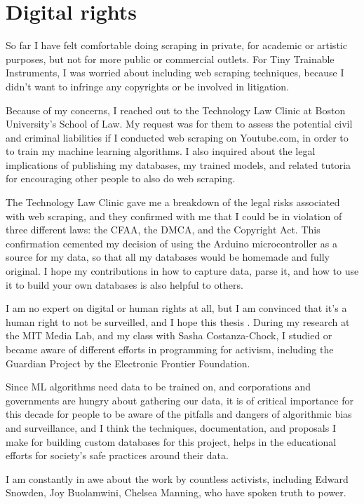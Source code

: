 \section{Digital rights}


So far I have felt comfortable doing scraping in private, for academic or artistic purposes, but not for more public or commercial outlets. For Tiny Trainable Instruments, I was worried about including web scraping techniques, because I didn't want to infringe any copyrights or be involved in litigation.

Because of my concerns, I reached out to the Technology Law Clinic \cite{website-boston-university-technology-law-clinic} at Boston University's School of Law. My request was for them to assess the potential civil and criminal liabilities if I conducted web scraping on Youtube.com, in order to to train my machine learning algorithms. I also inquired about the legal implications of publishing my databases, my trained models, and related tutoria for encouraging other people to also do web scraping.

The Technology Law Clinic gave me a breakdown of the legal risks associated with web scraping, and they confirmed with me that I could be in violation of three different laws: the \acrfull{CFAA}, the \acrfull{DMCA}, and the Copyright Act. This confirmation cemented my decision of using the Arduino microcontroller as a source for my data, so that all my databases would be homemade and fully original. I hope my contributions in how to capture data, parse it, and how to use it to build your own databases is also helpful to others.

I am no expert on digital or human rights at all, but I am convinced that it's a human right to not be surveilled, and I hope this thesis . During my research at the MIT Media Lab, and my class with Sasha Costanza-Chock, I studied or became aware of different efforts in programming for activism, including the Guardian Project by the Electronic Frontier Foundation.

Since \acrshort{ML} algorithms need data to be trained on, and corporations and governments are hungry about gathering our data, it is of critical importance for this decade for people to be aware of the pitfalls and dangers of algorithmic bias and surveillance, and I think the techniques, documentation, and proposals I make for building custom databases for this project, helps in the educational efforts for society's safe practices around their data.

I am constantly in awe about the work by countless activists, including Edward Snowden, Joy Buolamwini, Chelsea Manning, who have spoken truth to power.

